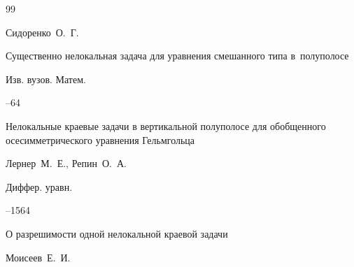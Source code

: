 \begin{thebibliography}{99}

\by Сидоренко~О.~Г.

\paper Существенно нелокальная задача для уравнения смешанного типа в~полуполосе

\jour Изв. вузов. Матем.



--64
















\paper Нелокальные краевые задачи в вертикальной полуполосе для обобщенного осесимметрического уравнения Гельмгольца

\by Лернер~М.~Е., Репин~О.~А.

\jour Диффер. уравн.




--1564









\paper О разрешимости одной нелокальной краевой задачи

\by Моисеев~Е.~И.


\end{thebibliography}
